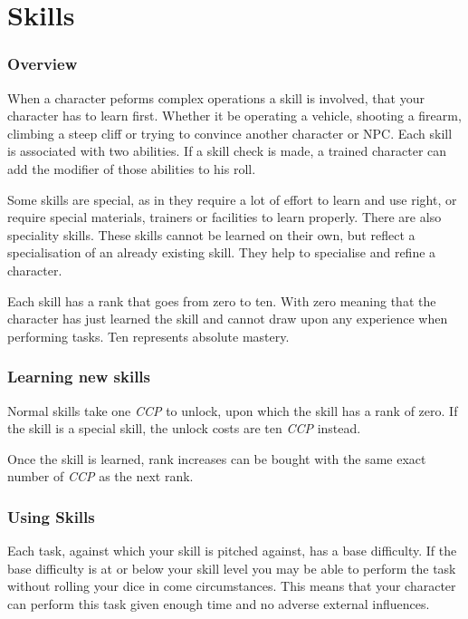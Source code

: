 \newcommand{\skill}[1]{\emph{#1}}

\chapter{Skills}

\subsection{Overview}

When a character peforms complex operations a skill is involved, that your
character has to learn first. Whether it be operating a vehicle, shooting a
firearm, climbing a steep cliff or trying to convince another character or
NPC. Each skill is associated with two abilities. If a skill check is made,
a trained character can add the modifier of those abilities to his roll.

Some skills are special, as in they require a lot of effort to learn and use
right, or require special materials, trainers or facilities to learn properly.
There are also speciality skills. These skills cannot be learned on their own,
but reflect a specialisation of an already existing skill. They help to
specialise and refine a character.

Each skill has a rank that goes from zero to ten. With zero meaning that the
character has just learned the skill and cannot draw upon any experience when
performing tasks. Ten represents absolute mastery.

\subsection{Learning new skills}

Normal skills take one \emph{CCP} to unlock, upon which the skill has a rank
of zero. If the skill is a special skill, the unlock costs are ten \emph{CCP}
instead.

Once the skill is learned, rank increases can be bought with the same exact
number of \emph{CCP} as the next rank.

\subsection{Using Skills}

Each task, against which your skill is pitched against, has a base difficulty.
If the base difficulty is at or below your skill level you may be able to
perform the task without rolling your dice in come circumstances. This means
that your character can perform this task given enough time and no adverse
external influences.

